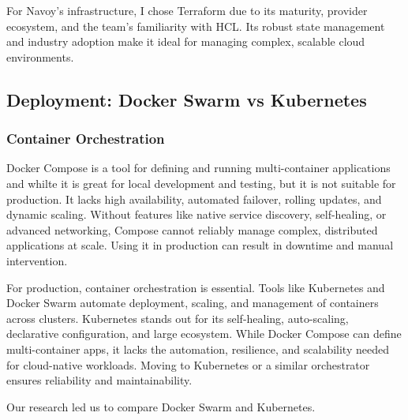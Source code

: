 For Navoy's infrastructure, I chose Terraform due to its maturity, provider ecosystem, and the team's familiarity with HCL. Its robust state management and industry adoption make it ideal for managing complex, scalable cloud environments.

\subsection{Deployment: Docker Swarm vs Kubernetes}

\subsubsection*{Container Orchestration}
Docker Compose is a tool for defining and running multi-container applications \cite{docker-compose} and whilte it is great for local development and testing, but it is not suitable for production. It lacks high availability, automated failover, rolling updates, and dynamic scaling. Without features like native service discovery, self-healing, or advanced networking, Compose cannot reliably manage complex, distributed applications at scale. Using it in production can result in downtime and manual intervention.

For production, container orchestration is essential. Tools like Kubernetes and Docker Swarm automate deployment, scaling, and management of containers across clusters. Kubernetes stands out for its self-healing, auto-scaling, declarative configuration, and large ecosystem. While Docker Compose can define multi-container apps, it lacks the automation, resilience, and scalability needed for cloud-native workloads. Moving to Kubernetes or a similar orchestrator ensures reliability and maintainability.

Our research led us to compare Docker Swarm and Kubernetes.

